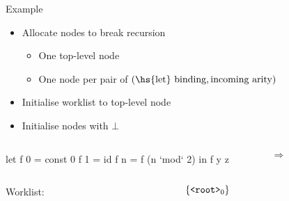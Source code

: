 \documentclass{haskellbeamer}
\begin{document}
\begin{frame}[fragile]{Example}
  \begin{itemize}
    \item Allocate nodes to break recursion
      \begin{itemize}
        \item One top-level node
        \item One node per pair of $(\text{\hs{let} binding}, \text{incoming arity})$
      \end{itemize}
    \item Initialise worklist to top-level node
    \item Initialise nodes with $\bot$
  \end{itemize}
  \begin{overprint}
    \begin{columns}
      \begin{column}{0.35\textwidth}
        \begin{haskell}
          let f 0 = const 0
              f 1 = id 
              f n = f (n `mod` 2)
          in f y z
        \end{haskell}
      \end{column}
      \begin{column}{0.02\textwidth}
        {\Huge$\Rightarrow$}
      \end{column}
      \begin{column}{0.4\textwidth}
      \end{column}
    \end{columns}
    \begin{columns}
      \begin{column}{0.55\textwidth}
        \hfill Worklist:
      \end{column}
      \begin{column}{0.55\textwidth}
        $\{\text{$\text{\texttt{<root>}}_{0}$}\}$ \hfill
      \end{column}
    \end{columns}
  \end{overprint}
\end{frame}
\end{document}
